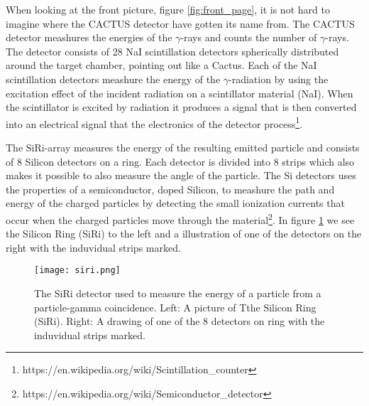 \documentclass[11pt,a4wide]{article}
\begin{document}
When looking at the front picture, figure \ref{fig:front_page}, it is not hard to imagine where the CACTUS detector have gotten its name from. The CACTUS detector meashures the energies of the $\gamma$-rays and counts the number of $\gamma$-rays. The detector consists of 28 NaI scintillation detectors spherically distributed around the target chamber, pointing out like a Cactus. Each of the NaI scintillation detectors  meashure the energy of the $\gamma$-radiation by using the excitation effect of the incident radiation on a scintillator material (NaI). When the scintillator is excited by radiation it produces a signal that is then converted into an electrical signal that the electronics of the detector process\footnote{https://en.wikipedia.org/wiki/Scintillation\_counter}. 

The SiRi-array measures the energy of the resulting emitted particle and consists of 8 Silicon detectors on a ring. Each detector is divided into 8 strips which also makes it possible to also measure the angle of the particle. The Si detectors uses the properties of a semiconductor, doped Silicon, to meashure the path and energy of the charged particles by detecting the small ionization currents that occur when the charged particles move through the material\footnote{https://en.wikipedia.org/wiki/Semiconductor\_detector}. In figure \ref{fig: siri} we see the Silicon Ring (SiRi) to the left and a illustration of one of the detectors on the right with the induvidual strips marked.
\begin{figure}[htp]
\centering
\texttt{[image: siri.png]}
\caption{The SiRi detector used to measure the energy of a particle from a particle-gamma coincidence. Left: A picture of Tthe Silicon Ring (SiRi). Right: A drawing of one of the 8 detectors on ring with the induvidual strips marked.}
\label{fig: siri}
\end{figure}


\end{document}
